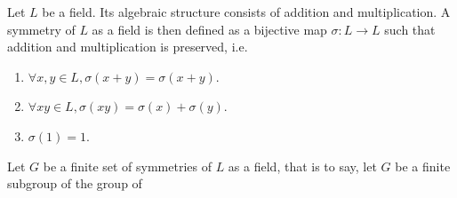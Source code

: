 \documentclass[../book.tex]{subfiles}
\begin{document}
Let $L$ be a field. 
Its algebraic structure consists of 
addition and multiplication. 
A symmetry of $L$ as a field is then defined as 
a bijective map $\sigma : L \to L$ such that 
addition and multiplication is preserved, i.e. 
\begin{enumerate}
    \item $\forall x, y \in L, \sigma(x + y) = \sigma(x + y)$.
    \item $\forall x y \in L, \sigma(x y) = \sigma(x) + \sigma(y)$. 
    \item $\sigma(1) = 1$. 
\end{enumerate}


Let $G$ be a finite set of symmetries of $L$ as a field,
that is to say, 
let $G$ be a finite subgroup of the group of 
\end{document}
